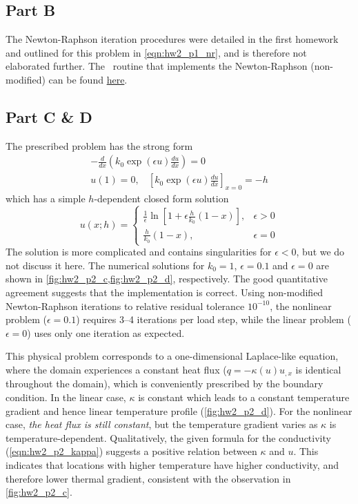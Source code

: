 \subsection{Part B}
The Newton-Raphson iteration procedures were detailed in the first homework and outlined for this problem in \cref{eqn:hw2_p1_nr}, and is therefore not elaborated further. 
The \matlab~routine that implements the Newton-Raphson (non-modified) can be found \href{https://github.com/sy-cui/CSE552-FA2024/blob/120296d43127bbe4347b004817ec7e08a5671894/homework/hw2/nr.m}{here}.

\subsection{Part C \& D}
The prescribed problem has the strong form 
\begin{equation}
\begin{gathered}
    -\frac{d}{dx} \left(k_0 \exp(\epsilon u) \frac{du}{dx}\right) = 0 \\
    u(1) = 0, ~~~~ {\left[k_0 \exp(\epsilon u)\frac{du}{dx}\right]}_{x=0} = -h
\end{gathered}
\end{equation}
which has a simple $h$-dependent closed form solution 
\begin{equation}
    u(x; h) = 
    \begin{cases}\frac{1}{\epsilon} 
        \ln \left[1 + \epsilon\frac{h}{k_0}(1-x)\right], & \epsilon > 0 \\
        \frac{h}{k_0}(1 - x), & \epsilon = 0
    \end{cases}
\end{equation}
The solution is more complicated and contains singularities for $\epsilon < 0$, but we do not discuss it here. 
The numerical solutions for $k_0 = 1$, $\epsilon = 0.1$ and $\epsilon = 0$ are shown in \cref{fig:hw2_p2_c,fig:hw2_p2_d}, respectively. 
The good quantitative agreement suggests that the implementation is correct. 
Using non-modified Newton-Raphson iterations to relative residual tolerance $10^{-10}$, the nonlinear problem ($\epsilon = 0.1$) requires 3--4 iterations per load step, while the linear problem ($\epsilon = 0$) uses only one iteration as expected. 

This physical problem corresponds to a one-dimensional Laplace-like equation, where the domain experiences a constant heat flux ($q = -\kappa(u)u_{,x}$ is identical throughout the domain), which is conveniently prescribed by the boundary condition. 
In the linear case, $\kappa$ is constant which leads to a constant temperature gradient and hence linear temperature profile (\cref{fig:hw2_p2_d}).
For the nonlinear case, \emph{the heat flux is still constant}, but the temperature gradient varies as $\kappa$ is temperature-dependent. 
Qualitatively, the given formula for the conductivity (\cref{eqn:hw2_p2_kappa}) suggests a positive relation between $\kappa$ and $u$.
This indicates that locations with higher temperature have higher conductivity, and therefore lower thermal gradient, consistent with the observation in \cref{fig:hw2_p2_c}.

